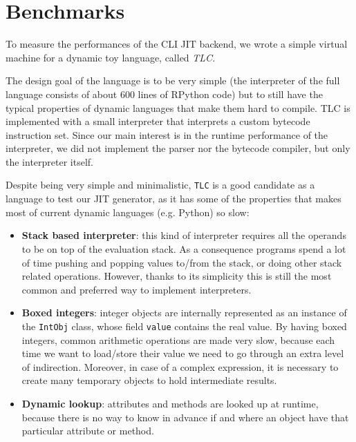 \section{Benchmarks}
\label{sec:benchmarks}

To measure the performances of the CLI JIT backend, we wrote a simple virtual
machine for a dynamic toy language, called \emph{TLC}.

The design goal of the language is to be very simple (the interpreter of the
full language consists of about 600 lines of RPython code) but to still have
the typical properties of dynamic languages that make them hard to
compile. TLC is implemented with a small interpreter that interprets a custom
bytecode instruction set. Since our main interest is in the runtime
performance of the interpreter, we did not implement the parser nor the
bytecode compiler, but only the interpreter itself.

Despite being very simple and minimalistic, \lstinline{TLC} is a good
candidate as a language to test our JIT generator, as it has some of the
properties that makes most of current dynamic languages (e.g. Python) so slow:

\begin{itemize}

\item \textbf{Stack based interpreter}: this kind of interpreter requires all the operands to be
  on top of the evaluation stack.  As a consequence programs spend a lot of
  time pushing and popping values to/from the stack, or doing other stack
  related operations.  However, thanks to its simplicity this is still the
  most common and preferred way to implement interpreters.

\item \textbf{Boxed integers}: integer objects are internally represented as
  an instance of the \lstinline{IntObj} class, whose field \lstinline{value}
  contains the real value.  By having boxed integers, common arithmetic
  operations are made very slow, because each time we want to load/store their
  value we need to go through an extra level of indirection.  Moreover, in
  case of a complex expression, it is necessary to create many temporary
  objects to hold intermediate results.

\item \textbf{Dynamic lookup}: attributes and methods are looked up at
  runtime, because there is no way to know in advance if and where an object
  have that particular attribute or method.
\end{itemize}

